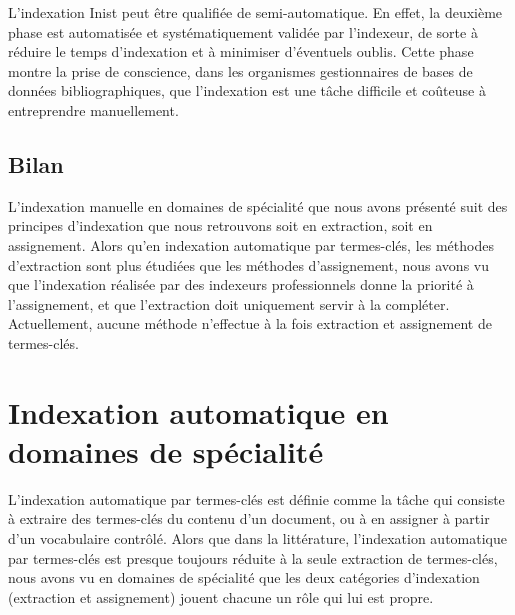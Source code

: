       L'indexation Inist peut être qualifiée de semi-automatique. En effet, la
      deuxième phase est automatisée et systématiquement validée par l'indexeur,
      de sorte à réduire le temps d'indexation et à minimiser d'éventuels
      oublis. Cette phase montre la prise de conscience, dans les organismes
      gestionnaires de bases de données bibliographiques, que l'indexation est
      une tâche difficile et coûteuse à entreprendre manuellement.

    \subsection{Bilan}
    \label{subsec:main-domain_specific_keyphrase_annotation-manual_keyphrase_annotation-conclusion}
      L'indexation manuelle en domaines de spécialité que nous avons présenté
      suit des principes d'indexation que nous retrouvons soit en extraction,
      soit en assignement. Alors qu'en indexation automatique par termes-clés,
      les méthodes d'extraction sont plus étudiées que les méthodes
      d'assignement, nous avons vu que l'indexation réalisée par des indexeurs
      professionnels donne la priorité à l'assignement, et que l'extraction doit
      uniquement servir à la compléter. Actuellement, aucune méthode n'effectue
      à la fois extraction et assignement de termes-clés.


  \section{Indexation automatique en domaines de spécialité}
  \label{sec:main-domain_specific_keyphrase_annotation-supervised_automatic_keyphrase_extraction}
    L'indexation automatique par termes-clés est définie comme la tâche qui
    consiste à extraire des termes-clés du contenu d'un document, ou à en
    assigner à partir d'un vocabulaire contrôlé. Alors que dans la
    littérature, l'indexation automatique par termes-clés est presque toujours réduite à la
    seule extraction de termes-clés, nous avons vu en domaines de spécialité
    que les deux catégories d'indexation (extraction et assignement) jouent
    chacune un rôle qui lui est propre.

